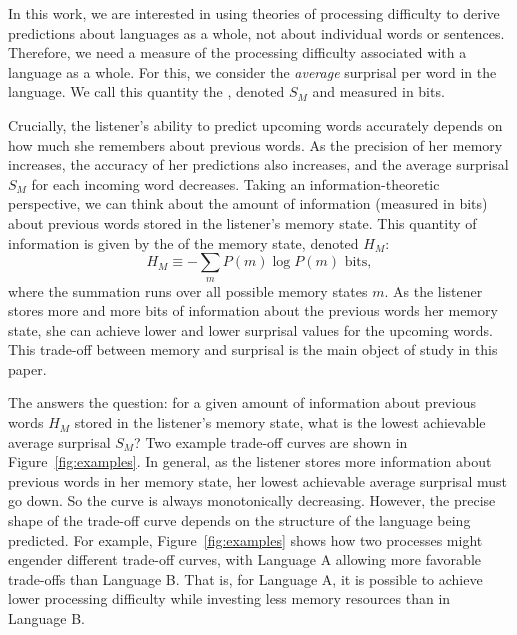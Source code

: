 In this work, we are interested in using theories of processing difficulty to derive predictions about languages as a whole, not about individual words or sentences. Therefore, we need a measure of the processing difficulty associated with a language as a whole. For this, we consider the \emph{average} surprisal per word in the language. We call this quantity the , denoted $S_M$ and measured in bits.

Crucially, the listener's ability to predict upcoming words accurately depends on how much she remembers about previous words. As the precision of her memory increases, the accuracy of her predictions also increases, and the average surprisal $S_M$ for each incoming word decreases. Taking an information-theoretic perspective, we can think about the amount of information (measured in bits) about previous words stored in the listener's memory state. This quantity of information is given by the  of the memory state, denoted $H_M$:
\begin{equation}
    H_M \equiv - \sum_m P(m) \log P(m) \text{ bits},
\end{equation}
where the summation runs over all possible memory states $m$. As the listener stores more and more bits of information about the previous words her memory state, she can achieve lower and lower surprisal values for the upcoming words. This trade-off between memory and surprisal is the main object of study in this paper.

The  answers the question: for a given amount of information about previous words $H_M$ stored in the listener's memory state, what is the lowest achievable average surprisal $S_M$? Two example trade-off curves are shown in Figure~\ref{fig:examples}. In general, as the listener stores more information about previous words in her memory state, her lowest achievable average surprisal must go down. So the curve is always monotonically decreasing. However, the precise shape of the trade-off curve depends on the structure of the language being predicted. For example, Figure~\ref{fig:examples} shows how two processes might engender different trade-off curves, with Language A allowing more favorable trade-offs than Language B. That is, for Language A, it is possible to achieve lower processing difficulty while investing less memory resources than in Language B.

